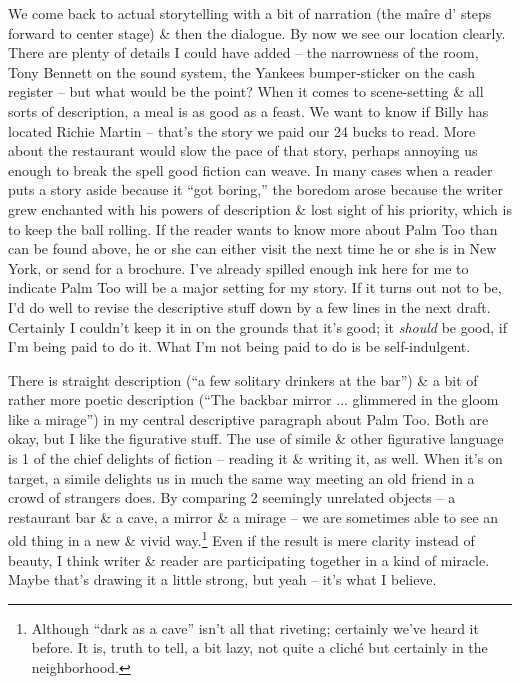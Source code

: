 \documentclass{article}
\numberwithin{equation}{section}
\begin{document}
We come back to actual storytelling with a bit of narration (the ma\^ire d' steps forward to center stage) \& then the dialogue. By now we see our location clearly. There are plenty of details I could have added -- the narrowness of the room, Tony Bennett on the sound system, the Yankees bumper-sticker on the cash register -- but what would be the point? When it comes to scene-setting \& all sorts of description, a meal is as good as a feast. We want to know if Billy has located Richie Martin -- that's the story we paid our 24 bucks to read. More about the restaurant would slow the pace of that story, perhaps annoying us enough to break the spell good fiction can weave. In many cases when a reader puts a story aside because it ``got boring,'' the boredom arose because the writer grew enchanted with his powers of description \& lost sight of his priority, which is to keep the ball rolling. If the reader wants to know more about Palm Too than can be found above, he or she can either visit the next time he or she is in New York, or send for a brochure. I've already spilled enough ink here for me to indicate Palm Too will be a major setting for my story. If it turns out not to be, I'd do well to revise the descriptive stuff down by a few lines in the next draft. Certainly I couldn't keep it in on the grounds that it's good; it \textit{should} be good, if I'm being paid to do it. What I'm not being paid to do is be self-indulgent.

There is straight description (``a few solitary drinkers at the bar'') \& a bit of rather more poetic description (``The backbar mirror $\ldots$ glimmered in the gloom like a mirage'') in my central descriptive paragraph about Palm Too. Both are okay, but I like the figurative stuff. The use of simile \& other figurative language is 1 of the chief delights of fiction -- reading it \& writing it, as well. When it's on target, a simile delights us in much the same way meeting an old friend in a crowd of strangers does. By comparing 2 seemingly unrelated objects -- a restaurant bar \& a cave, a mirror \& a mirage -- we are sometimes able to see an old thing in a new \& vivid way.\footnote{Although ``dark as a cave'' isn't all that riveting; certainly we've heard it before. It is, truth to tell, a bit lazy, not quite a clich\'e but certainly in the neighborhood.} Even if the result is mere clarity instead of beauty, I think writer \& reader are participating together in a kind of miracle. Maybe that's drawing it a little strong, but yeah -- it's what I believe.
\end{document}

